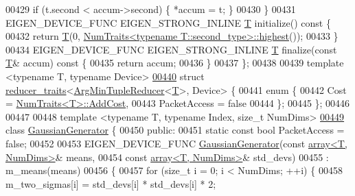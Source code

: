\begin{DoxyCode}
00429     \textcolor{keywordflow}{if} (t.second < accum->second) \{ *accum = t; \}
00430   \}
00431   EIGEN\_DEVICE\_FUNC EIGEN\_STRONG\_INLINE \hyperlink{group___sparse_core___module}{T} initialize()\textcolor{keyword}{ const }\{
00432     \textcolor{keywordflow}{return} \hyperlink{group___sparse_core___module}{T}(0, \hyperlink{group___core___module_struct_eigen_1_1_num_traits}{NumTraits<typename T::second\_type>::highest}());
00433   \}
00434   EIGEN\_DEVICE\_FUNC EIGEN\_STRONG\_INLINE \hyperlink{group___sparse_core___module}{T} finalize(\textcolor{keyword}{const} \hyperlink{group___sparse_core___module}{T}& accum)\textcolor{keyword}{ const }\{
00435     \textcolor{keywordflow}{return} accum;
00436   \}
00437 \};
00438 
00439 \textcolor{keyword}{template} <\textcolor{keyword}{typename} T, \textcolor{keyword}{typename} Device>
\hyperlink{struct_eigen_1_1internal_1_1reducer__traits_3_01_arg_min_tuple_reducer_3_01_t_01_4_00_01_device_01_4}{00440} \textcolor{keyword}{struct }\hyperlink{struct_eigen_1_1internal_1_1reducer__traits}{reducer\_traits}<\hyperlink{struct_eigen_1_1internal_1_1_arg_min_tuple_reducer}{ArgMinTupleReducer}<\hyperlink{group___sparse_core___module}{T}>, Device> \{
00441   \textcolor{keyword}{enum} \{
00442     Cost = \hyperlink{group___core___module_struct_eigen_1_1_num_traits}{NumTraits<T>::AddCost},
00443     PacketAccess = \textcolor{keyword}{false}
00444   \};
00445 \};
00446 
00447 
00448 \textcolor{keyword}{template} <\textcolor{keyword}{typename} T, \textcolor{keyword}{typename} Index, \textcolor{keywordtype}{size\_t} NumDims>
\hyperlink{class_eigen_1_1internal_1_1_gaussian_generator}{00449} \textcolor{keyword}{class }\hyperlink{class_eigen_1_1internal_1_1_gaussian_generator}{GaussianGenerator} \{
00450  \textcolor{keyword}{public}:
00451   \textcolor{keyword}{static} \textcolor{keyword}{const} \textcolor{keywordtype}{bool} PacketAccess = \textcolor{keyword}{false};
00452 
00453   EIGEN\_DEVICE\_FUNC \hyperlink{class_eigen_1_1internal_1_1_gaussian_generator}{GaussianGenerator}(\textcolor{keyword}{const} \hyperlink{class_eigen_1_1array}{array<T, NumDims>}& means,
00454                                       \textcolor{keyword}{const} \hyperlink{class_eigen_1_1array}{array<T, NumDims>}& std\_devs)
00455       : m\_means(means)
00456   \{
00457     \textcolor{keywordflow}{for} (\textcolor{keywordtype}{size\_t} i = 0; i < NumDims; ++i) \{
00458       m\_two\_sigmas[i] = std\_devs[i] * std\_devs[i] * 2;

\end{DoxyCode}
